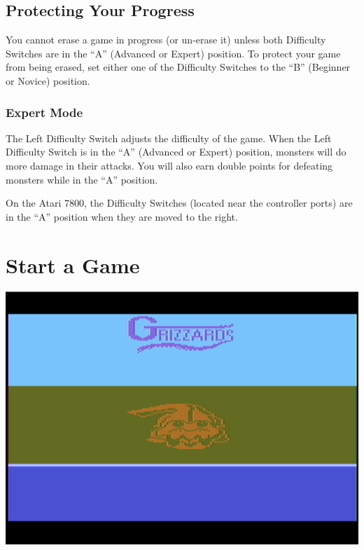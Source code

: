\documentclass[10pt,twocolumn,openany,article]{memoir}
\begin{document}
\ifdefined\ATARIAGESAVE\vfill\fi

\ifdefined\NOSAVE\else

\subsection{Protecting Your Progress}

You  cannot erase  a  game  in progress  (or  un-erase  it) unless  both
Difficulty  Switches are  in the  ``A'' (Advanced  or Expert)  position.
To protect your game from being erased, set either one of the Difficulty
Switches to the ``B'' (Beginner or Novice) position.

\fi

\ifdefined\ATARIAGESAVE\vfill\fi

\subsubsection*{Expert Mode}

The Left Difficulty Switch adjusts the  difficulty of the game. When the
Left Difficulty  Switch is in  the ``A'' (Advanced or  Expert) position,
monsters will do more damage in their attacks. You will also earn double
points for defeating monsters while in the ``A'' position.

On the Atari 7800, the  Difficulty Switches (located near the controller
ports) are in the ``A'' position when they are moved to the right.

\ifdefined\ATARIAGESAVE\vfill\pagebreak\fi

\section{Start a Game}

\begin{center}
  \includegraphics[width=\columnwidth]{../Manual/TitleAquaxNTSC.png}
\end{center}
\end{document}
